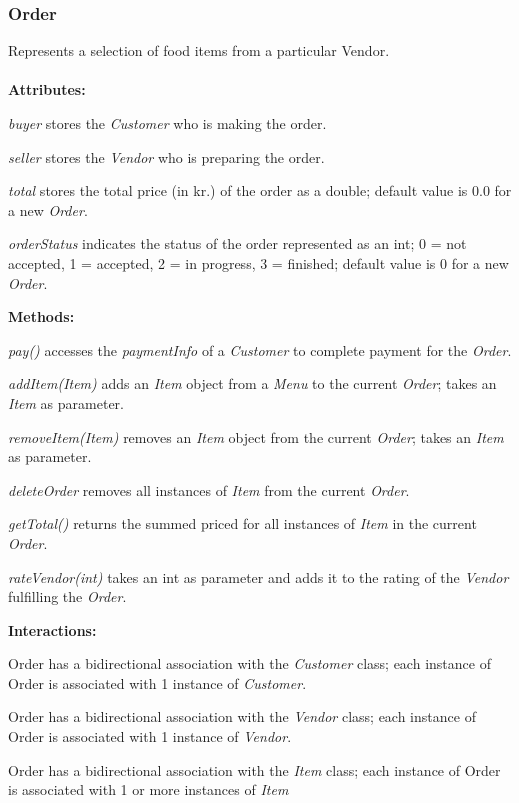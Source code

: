 \subsubsection{Order}
Represents a selection of food items from a particular Vendor. \\ \\
\textbf{Attributes:}
\begin{description}
\item\textit{buyer} stores the \emph{Customer} who is making the order.
\item \textit{seller} stores the \emph{Vendor} who is preparing the order.
\item\textit{total} stores the total price (in kr.) of the order as a double; default value is 0.0 for a new \emph{Order}.
\item\textit{orderStatus} indicates the status of the order represented as an int; 0 = not accepted, 1 = accepted, 2 = in progress, 3 = finished; default value is 0 for a new \emph{Order}.
\end{description}
\textbf{Methods:}
\begin{description}
\item\textit{pay()} accesses the \emph{paymentInfo} of a \emph{Customer} to complete payment for the \emph{Order}.
\item\textit{addItem(Item)} adds an \emph{Item} object from a \emph{Menu} to the current \emph{Order}; takes an \emph{Item} as parameter.
\item\textit{removeItem(Item)} removes an \emph{Item} object from the current \emph{Order}; takes an \emph{Item} as parameter.
\item\textit{deleteOrder} removes all instances of \emph{Item} from the current \emph{Order}.
\item\textit{getTotal()} returns the summed priced for all instances  of \emph{Item} in the current \emph{Order}.
\item\textit{rateVendor(int)} takes an int as parameter and adds it to the rating of the \emph{Vendor} fulfilling the \emph{Order}.
\end{description}
\textbf{Interactions:}
\begin{description}
\item Order has a bidirectional association with the \emph{Customer} class; each instance of Order is associated with 1 instance of \emph{Customer}.
\item Order has a bidirectional association with the \emph{Vendor} class; each instance of Order is associated with 1 instance of \emph{Vendor}.
\item Order has a bidirectional association with the \emph{Item} class; each instance of Order is associated with 1 or more instances of \emph{Item}
\end{description}
\vspace{.2cm}
